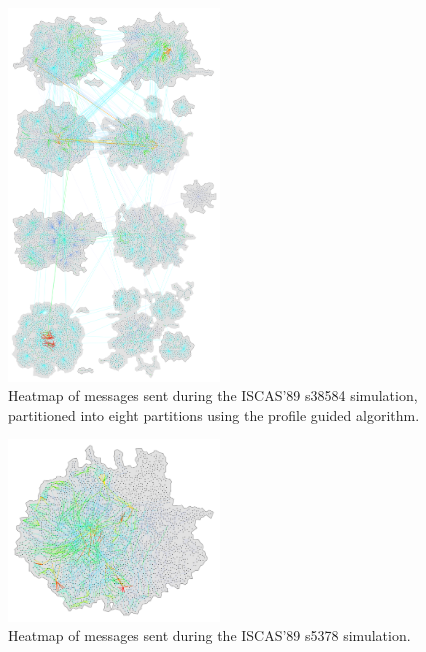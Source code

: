 \documentclass[11pt]{book}
\begin{document}
\begin{figure}
\centering
\includegraphics[clip=true,width=0.5\textwidth]{figs/s38584_8part.pdf}
\caption{Heatmap of messages sent during the ISCAS'89 s38584 simulation, partitioned into eight partitions using the profile guided algorithm.}
\end{figure}

\begin{figure}
\centering
\includegraphics[clip=true,width=0.5\textwidth]{figs/s5378.pdf}
\caption{Heatmap of messages sent during the ISCAS'89 s5378 simulation.}
\end{figure}
\end{document}

